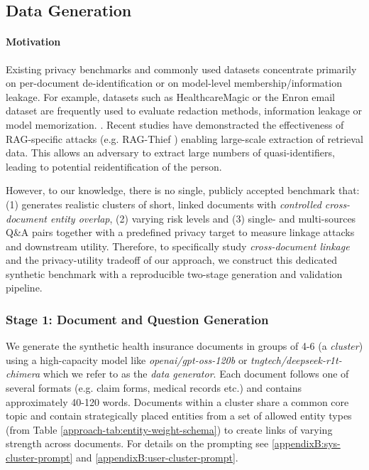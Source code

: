 \subsection{Data Generation}\label{evaluation-subsec:data-generation}
\paragraph{Motivation}
Existing privacy benchmarks and commonly used datasets concentrate primarily on per-document de-identification or on model-level membership/information leakage. For example, datasets such as HealthcareMagic or the Enron email dataset are frequently used to evaluate redaction methods, information leakage or model memorization. \cite{ragSAGE, ragThief, goodAndBad, proactivePrivAmnesiaLLM}. Recent studies have demonstracted the effectiveness of RAG-specific attacks (e.g. RAG-Thief \cite{ragThief}) enabling large-scale extraction of retrieval data. This allows an adversary to extract large numbers of quasi-identifiers, leading to potential reidentification of the person. \cite{simpleDemographic, netflixDeAnon} 

However, to our knowledge, there is no single, publicly accepted benchmark that: (1) generates realistic clusters of short, linked documents with \textit{controlled cross-document entity overlap}, (2) varying risk levels and (3) single- and multi-sources Q\&A pairs together with a predefined privacy target to measure linkage attacks and downstream utility. Therefore, to specifically study \textit{cross-document linkage} and the privacy-utility tradeoff of our approach, we construct this dedicated synthetic benchmark with a reproducible two-stage generation and validation pipeline. 

\subsubsection{Stage 1: Document and Question Generation}
We generate the synthetic health insurance documents in groups of 4-6 (a \textit{cluster}) using a high-capacity model like \textit{openai/gpt-oss-120b} or \textit{tngtech/deepseek-r1t-chimera} which we refer to as the \textit{data generator}. Each document follows one of several formats (e.g. claim forms, medical records etc.) and contains approximately 40-120 words. Documents within a cluster share a common core topic and contain strategically placed entities from a set of allowed entity types (from Table \ref{approach-tab:entity-weight-schema}) to create links of varying strength across documents. For details on the prompting see \ref{appendixB:sys-cluster-prompt} and \ref{appendixB:user-cluster-prompt}. 

